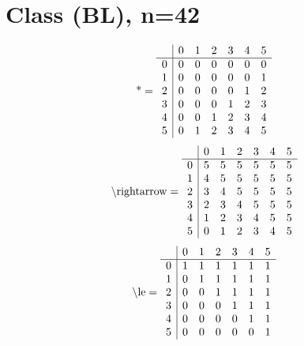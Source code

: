 \documentclass[11pt]{article}
\begin{document}
\section{Class (BL), n=42}
\[\text{*} = 
\begin{array}{r | r r r r r r}
 & 0 & 1 & 2 & 3 & 4 & 5 \\ \hline
0 & 0 & 0 & 0 & 0 & 0 & 0 \\
1 & 0 & 0 & 0 & 0 & 0 & 1 \\
2 & 0 & 0 & 0 & 0 & 1 & 2 \\
3 & 0 & 0 & 0 & 1 & 2 & 3 \\
4 & 0 & 0 & 1 & 2 & 3 & 4 \\
5 & 0 & 1 & 2 & 3 & 4 & 5 \\
\end{array}
\]
\[\text{\textbackslash rightarrow} = 
\begin{array}{r | r r r r r r}
 & 0 & 1 & 2 & 3 & 4 & 5 \\ \hline
0 & 5 & 5 & 5 & 5 & 5 & 5 \\
1 & 4 & 5 & 5 & 5 & 5 & 5 \\
2 & 3 & 4 & 5 & 5 & 5 & 5 \\
3 & 2 & 3 & 4 & 5 & 5 & 5 \\
4 & 1 & 2 & 3 & 4 & 5 & 5 \\
5 & 0 & 1 & 2 & 3 & 4 & 5 \\
\end{array}
\]
\[\text{\textbackslash le} = 
\begin{array}{r | r r r r r r}
 & 0 & 1 & 2 & 3 & 4 & 5 \\ \hline
0 & 1 & 1 & 1 & 1 & 1 & 1 \\
1 & 0 & 1 & 1 & 1 & 1 & 1 \\
2 & 0 & 0 & 1 & 1 & 1 & 1 \\
3 & 0 & 0 & 0 & 1 & 1 & 1 \\
4 & 0 & 0 & 0 & 0 & 1 & 1 \\
5 & 0 & 0 & 0 & 0 & 0 & 1 \\
\end{array}
\]
\end{document}
